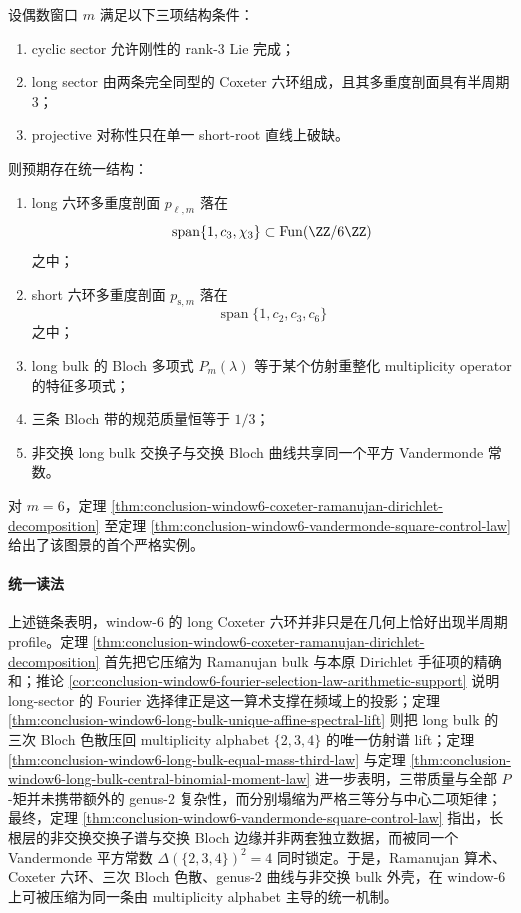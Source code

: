 \begin{conjecture}\label{conj:conclusion-even-window-mod3-coxeter-ramanujan-universality}
设偶数窗口 \(m\) 满足以下三项结构条件：
\begin{enumerate}
  \item cyclic sector 允许刚性的 rank-\(3\) Lie 完成；
  \item long sector 由两条完全同型的 Coxeter 六环组成，且其多重度剖面具有半周期 \(3\)；
  \item projective 对称性只在单一 short-root 直线上破缺。
\end{enumerate}
则预期存在统一结构：
\begin{enumerate}
  \item long 六环多重度剖面 \(p_{\ell,m}\) 落在
  \[
  \operatorname{span}\{1,c_3,\chi_3\}\subset \operatorname{Fun}(\ZZ/6\ZZ)
  \]
  之中；
  \item short 六环多重度剖面 \(p_{\mathrm{s},m}\) 落在
  \[
  \operatorname{span}\{1,c_2,c_3,c_6\}
  \]
  之中；
  \item long bulk 的 Bloch 多项式 \(P_m(\lambda)\) 等于某个仿射重整化 multiplicity operator 的特征多项式；
  \item 三条 Bloch 带的规范质量恒等于 \(1/3\)；
  \item 非交换 long bulk 交换子与交换 Bloch 曲线共享同一个平方 Vandermonde 常数。
\end{enumerate}
对 \(m=6\)，定理 \ref{thm:conclusion-window6-coxeter-ramanujan-dirichlet-decomposition} 至定理 \ref{thm:conclusion-window6-vandermonde-square-control-law} 给出了该图景的首个严格实例。
\end{conjecture}

\paragraph{统一读法}
上述链条表明，window-\(6\) 的 long Coxeter 六环并非只是在几何上恰好出现半周期 profile。定理 \ref{thm:conclusion-window6-coxeter-ramanujan-dirichlet-decomposition} 首先把它压缩为 Ramanujan bulk 与本原 Dirichlet 手征项的精确和；推论 \ref{cor:conclusion-window6-fourier-selection-law-arithmetic-support} 说明 long-sector 的 Fourier 选择律正是这一算术支撑在频域上的投影；定理 \ref{thm:conclusion-window6-long-bulk-unique-affine-spectral-lift} 则把 long bulk 的三次 Bloch 色散压回 multiplicity alphabet \(\{2,3,4\}\) 的唯一仿射谱 lift；定理 \ref{thm:conclusion-window6-long-bulk-equal-mass-third-law} 与定理 \ref{thm:conclusion-window6-long-bulk-central-binomial-moment-law} 进一步表明，三带质量与全部 \(P\)-矩并未携带额外的 genus-\(2\) 复杂性，而分别塌缩为严格三等分与中心二项矩律；最终，定理 \ref{thm:conclusion-window6-vandermonde-square-control-law} 指出，长根层的非交换交换子谱与交换 Bloch 边缘并非两套独立数据，而被同一个 Vandermonde 平方常数 \(\Delta(\{2,3,4\})^2=4\) 同时锁定。于是，Ramanujan 算术、Coxeter 六环、三次 Bloch 色散、genus-\(2\) 曲线与非交换 bulk 外壳，在 window-\(6\) 上可被压缩为同一条由 multiplicity alphabet 主导的统一机制。

\endinput
